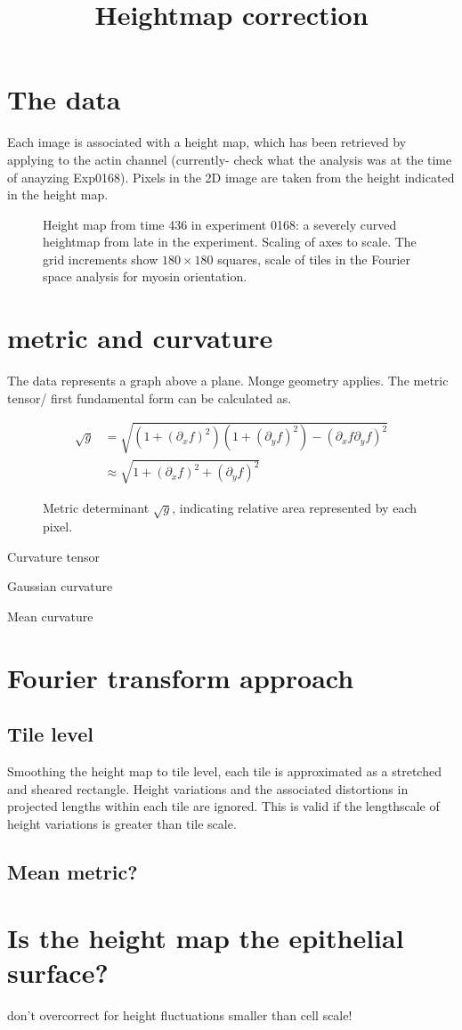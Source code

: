 \documentclass[10pt,a4paper]{article}
\title{Heightmap correction}
\begin{document}
\section{The data}
Each image is associated with a height map, which has been retrieved by applying \texttt{} to the actin channel (currently- check what the analysis was at the time of anayzing Exp0168).  Pixels in the 2D image are taken from the height indicated in the height map.  
\begin{figure}
\caption{Height map from time 436 in experiment 0168: a severely curved heightmap from late in the experiment.  Scaling of axes to scale.  The grid increments show $180 \times 180$ squares, scale of tiles in the Fourier space analysis for myosin orientation.}
\end{figure}
\section{metric and curvature}
The data represents a graph above a plane.  Monge geometry applies.  The metric tensor/ first fundamental form can be calculated as.

\begin{equation}
\begin{aligned}
\sqrt{g} &=  \sqrt{(1 + (\partial_x f)^2)(1 + (\partial_y f)^2)-(\partial_x f \partial_y f)^2}\\
&\approx \sqrt{1 + (\partial_x f)^2 + (\partial_y f)^2}
\end{aligned}
\end{equation}


\begin{figure}
\caption{Metric determinant $\sqrt{g}$, indicating relative area represented by each pixel.}
\end{figure}

Curvature tensor

Gaussian curvature

Mean curvature

\section{Fourier transform approach}
\subsection{Tile level}
Smoothing the height map to tile level, each tile is approximated as a stretched and sheared rectangle.  Height variations and the associated distortions in projected lengths within each tile are ignored.  This is valid if the lengthscale of height variations is greater than tile scale.
\subsection{Mean metric?}
\section{Is the height map the epithelial surface?}
don't overcorrect for height fluctuations smaller than cell scale!
\end{document}
